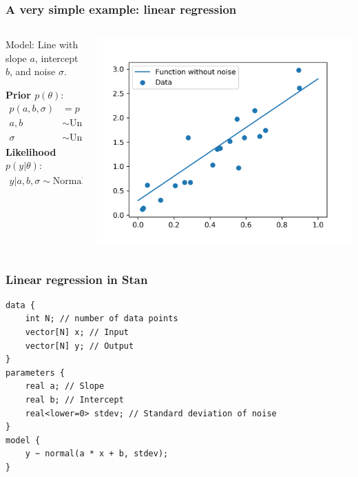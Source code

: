 \documentclass{beamer}
\begin{document}
\begin{frame}
\frametitle{A very simple example: linear regression}
\begin{columns}
\begin{column}{0.5\textwidth}
	Model: Line with slope $a$, intercept $b$, and noise $\sigma$.

	\textbf{Prior $p(\theta)$}:
	\begin{align*}
		p(a, b, \sigma) & = p(a)p(b)p(\sigma) \\
		a, b & \sim \textrm{Uniform}(-\infty, +\infty) \\
		\sigma & \sim \textrm{Uniform}(0, +\infty)
	\end{align*}
	\textbf{Likelihood $p(y | \theta)$}:
	\begin{align*}
		y | a, b, \sigma \sim \textrm{Normal}(ax + b, \sigma^2)	
	\end{align*}
\end{column}
\begin{column}{0.5\textwidth}	
\includegraphics[width=\textwidth]{lin_reg_data}	
\end{column}
\end{columns}
\end{frame}

\begin{frame}[fragile]
\frametitle{Linear regression in Stan}
\begin{verbatim}
data {
    int N; // number of data points
    vector[N] x; // Input
    vector[N] y; // Output
}
parameters {
    real a; // Slope
    real b; // Intercept
    real<lower=0> stdev; // Standard deviation of noise
}
model {
    y ~ normal(a * x + b, stdev);
}
\end{verbatim}
\end{frame}
\end{document}
